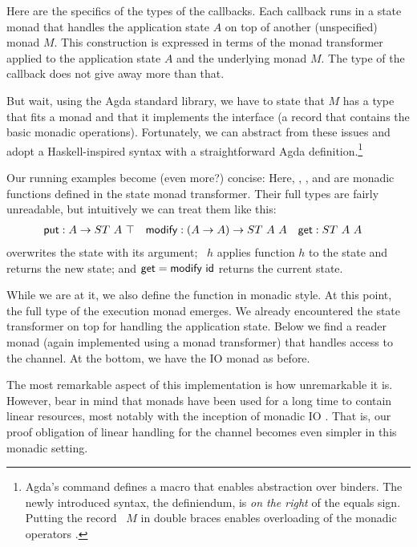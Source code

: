 \documentclass[acmsmall,screen]{acmart}
\begin{document}
\mstCommand

Here are the specifics of the types of the callbacks. Each callback
runs in a state monad that handles the application state $A$ on top of
another (unspecified) monad $M$. This construction is expressed in terms of the
monad transformer {\AStateT} applied to the application state
$A$ and the underlying monad $M$. The type of the callback does not give away more
than that.

But wait, using the Agda standard library, we have to state that $M$
has a type that fits a monad and that it implements the
interface {\ARawMonad} (a record that contains the basic monadic
operations).
Fortunately, we can abstract from these issues and adopt a
Haskell-inspired syntax with a straightforward
Agda definition.\footnote{Agda's  command defines
  a macro that enables abstraction over binders. The newly introduced
  syntax, the definiendum, is \emph{on the right} of the equals
  sign. Putting the record {\ARawMonad~$M$} in double braces enables overloading of the
  monadic operators \cite{DBLP:conf/icfp/DevrieseP11}.}
\mstMonadic

Our running examples become (even more?) concise:
\mstExampleServers
Here, {\Aput}, {\Amodify}, and {\Aget} are monadic functions defined
in the state monad transformer. Their full types are fairly
unreadable, but intuitively we can treat them like this:
\begin{align*}
  \Aput &: A \to ST~A~\top
  & \Amodify &: (A \to A)\to ST~A~A
  & \Aget &: ST~A~A
\end{align*}
{\Aput} overwrites the state with its argument; {\Amodify~$h$} applies 
function $h$ to the state and returns the new state; and {$\Aget = \Amodify~\Aid$} returns the current state.

While we are at it, we also define the {\Aexecutor} function in
monadic style. At this point, the full type of the execution monad
emerges. We already encountered the state transformer on top for
handling the application state. Below we find a reader monad (again
implemented using a monad transformer) that handles access to the
channel. At the bottom, we have the IO monad as before.
\mstExecutor

The most remarkable aspect of this implementation is how unremarkable
it is. However, bear in mind that monads have been used for a long
time to contain linear resources, most notably with the inception of
monadic IO \cite{DBLP:conf/popl/JonesW93}. That is, our proof
obligation of linear handling for the channel becomes even simpler in
this monadic setting.
\end{document}
